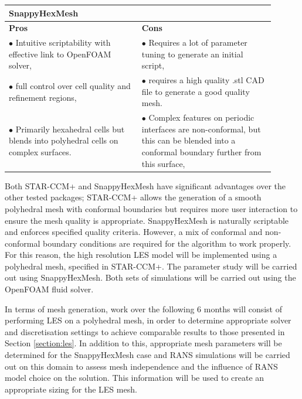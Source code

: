 \documentclass[12pt,oneside,a4paper]{article}
\begin{document}
\begin{table}[!t]
\begin{tabular}{p{0.45\linewidth}p{0.45\linewidth}}
\textbf{SnappyHexMesh}	&	\\
\hline
\textbf{Pros}	&	\textbf{Cons}	\\
$\bullet$	Intuitive scriptability with effective link to OpenFOAM solver,
&
$\bullet$ Requires a lot of parameter tuning to generate an initial script,
\\
$\bullet$	full control over cell quality and refinement regions,
&
$\bullet$ requires a high quality .stl CAD file to generate a good quality mesh.
\\
$\bullet$	Primarily hexahedral cells but blends into polyhedral cells on complex surfaces.
&
$\bullet$	Complex features on periodic interfaces are non-conformal, but this can be blended into a conformal boundary further from this surface,

\end{tabular}
\end{table}

Both STAR-CCM+ and SnappyHexMesh have significant advantages over the other tested packages; STAR-CCM+ allows the generation of a smooth polyhedral mesh with conformal boundaries but requires more user interaction to ensure the mesh quality is appropriate. SnappyHexMesh is naturally scriptable and enforces specified quality criteria. However, a mix of conformal and non-conformal boundary conditions are required for the algorithm to work properly. For this reason, the high resolution LES model will be implemented using a polyhedral mesh, specified in STAR-CCM+. The parameter study will be carried out using SnappyHexMesh. Both sets of simulations will be carried out using the OpenFOAM fluid solver.

In terms of mesh generation, work over the following 6 months will consist of performing LES on a polyhedral mesh, in order to determine appropriate solver and discretisation settings to achieve comparable results to those presented in Section \ref{section:les}. In addition to this, appropriate mesh parameters will be determined for the SnappyHexMesh case and RANS simulations will be carried out on this domain to assess mesh independence and the influence of RANS model choice on the solution. This information will be used to create an appropriate sizing for the LES mesh.
\end{document}
